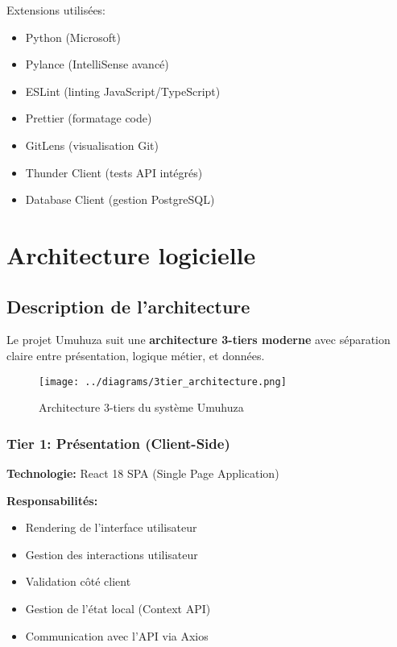 Extensions utilisées:
\begin{itemize}
    \item Python (Microsoft)
    \item Pylance (IntelliSense avancé)
    \item ESLint (linting JavaScript/TypeScript)
    \item Prettier (formatage code)
    \item GitLens (visualisation Git)
    \item Thunder Client (tests API intégrés)
    \item Database Client (gestion PostgreSQL)
\end{itemize}

\section{Architecture logicielle}

\subsection{Description de l'architecture}

Le projet Umuhuza suit une \textbf{architecture 3-tiers moderne} avec séparation claire entre présentation, logique métier, et données.

\begin{figure}[H]
\centering
\texttt{[image: ../diagrams/3tier\_architecture.png]}
\caption{Architecture 3-tiers du système Umuhuza}
\label{fig:3tier}
\end{figure}

\subsubsection{Tier 1: Présentation (Client-Side)}

\textbf{Technologie:} React 18 SPA (Single Page Application)

\textbf{Responsabilités:}
\begin{itemize}
    \item Rendering de l'interface utilisateur
    \item Gestion des interactions utilisateur
    \item Validation côté client
    \item Gestion de l'état local (Context API)
    \item Communication avec l'API via Axios
\end{itemize}

